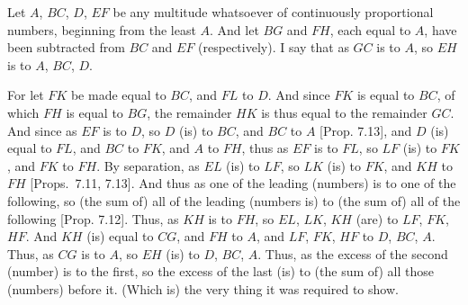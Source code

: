 \begin{Parallel}{}{}
{\epsfysize=1.6in
\centerline{}

Let $A$, $BC$, $D$, $EF$ be any multitude whatsoever of continuously proportional numbers, beginning from the least $A$.  And let $BG$ and
$FH$, each equal to $A$, have been subtracted from $BC$ and $EF$ (respectively). I say that as $GC$ is to $A$, so $EH$ is to $A$, $BC$, $D$.

For let $FK$ be made equal to $BC$, and $FL$ to  $D$. And since $FK$
is equal to $BC$, of which $FH$ is equal to $BG$, the remainder
$HK$ is thus equal to the remainder $GC$. And since as $EF$ is to $D$, so
$D$ (is) to $BC$, and $BC$ to $A$ [Prop. 7.13],
and $D$ (is) equal to $FL$, and $BC$ to $FK$, and $A$ to  $FH$, thus
as $EF$ is to $FL$, so $LF$ (is) to $FK$, and $FK$ to $FH$. By
separation, as $EL$ (is) to $LF$, so $LK$ (is) to $FK$, and $KH$ to $FH$
[Props.~7.11, 7.13]. And thus
as one of the leading (numbers) is to one of the following, so (the sum of) all of the leading (numbers is) to (the sum of) all of the following [Prop. 7.12]. Thus, as $KH$ is to $FH$, so
$EL$, $LK$, $KH$ (are) to $LF$, $FK$, $HF$.  And $KH$ (is) equal to
$CG$, and $FH$ to $A$, and $LF$, $FK$, $HF$ to $D$, $BC$, $A$.
Thus, as $CG$ is to $A$, so $EH$ (is) to $D$, $BC$, $A$. Thus,
as the excess of the second (number) is to the first, so the excess of the last
(is) to (the sum of) all  those (numbers) before it. (Which is) the very thing it was required to show.}
\end{Parallel}



